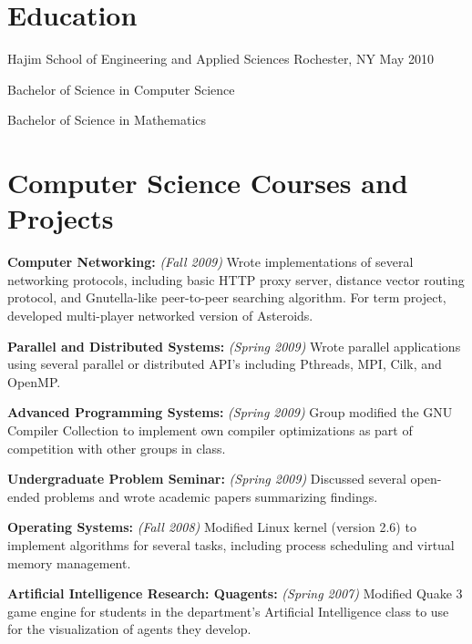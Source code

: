 \documentclass[letterpaper]{resume}
\begin{document}
\section{Education}

            {Hajim School of Engineering and Applied Sciences}
            {Rochester, NY}
            {May 2010}

\begin{compactitem}
	\item Bachelor of Science in Computer Science \par
	\item Bachelor of Science in Mathematics \par
\end{compactitem}

\section{Computer Science Courses and Projects}
\vspace{\secskip}

\begin{compactitem}
	\item \textbf{Computer Networking:} \textit{(Fall 2009)} Wrote implementations of several networking protocols, including basic HTTP proxy server, distance vector routing protocol, and Gnutella-like peer-to-peer searching algorithm. For term project, developed multi-player networked version of Asteroids. \par
	
	\item \textbf{Parallel and Distributed Systems:} \textit{(Spring 2009)} Wrote parallel applications using several parallel or distributed API's including Pthreads, MPI, Cilk, and OpenMP. \par

	\item \textbf{Advanced Programming Systems:} \textit{(Spring 2009)} Group modified the GNU Compiler Collection to implement own compiler optimizations as part of competition with other groups in class. \par

	\item \textbf{Undergraduate Problem Seminar:} \textit{(Spring 2009)} Discussed several open-ended problems and wrote academic papers summarizing findings. \par
	
	\item \textbf{Operating Systems:} \textit{(Fall 2008)} Modified Linux kernel (version 2.6) to implement algorithms for several tasks, including process scheduling and virtual memory management. \par
	
	\item \textbf{Artificial Intelligence Research: Quagents:} \textit{(Spring 2007)} Modified Quake 3 game engine for students in the department's Artificial Intelligence class to use for the visualization of agents they develop. \par
\end{compactitem}
\end{document}
